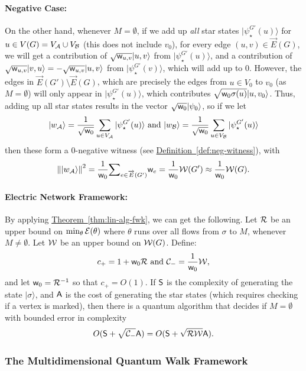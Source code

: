 \documentclass{article}
\newcommand{\thm}[1]{\hyperref[thm:#1]{Theorem~\ref*{thm:#1}}}
\newcommand{\defin}[1]{\hyperref[def:#1]{Definition~\ref*{def:#1}}}
\def\ket#1{{\lvert}#1\rangle}
\renewcommand{\>}{\rangle}
\newcommand{\<}{\langle}
\renewcommand{\(}{\left(}
\renewcommand{\)}{\right)}
\def\norm#1{\left\| #1 \right\|}
\def\w{{\sf w}}
\begin{document}
\paragraph{Negative Case:} On the other hand, whenever $M=\emptyset$, if we add up \emph{all} star states $\ket{\psi_\star^{G'}(u)}$ for $u\in V(G)=V_{\cal A}\cup V_{\cal B}$ (this does not include $v_0$), for every edge $(u,v)\in \overrightarrow{E}(G)$, we will get a contribution of $\sqrt{\w_{u,v}}\ket{u,v}$ from $\ket{\psi_\star^{G'}(u)}$, and a contribution of $\sqrt{\w_{u,v}}\ket{v,u}=-\sqrt{\w_{u,v}}\ket{u,v}$ from $\ket{\psi_\star^{G'}(v)}$, which will add up to 0. However, the edges in $\overrightarrow{E}(G')\setminus\overrightarrow{E}(G)$, which are precisely the edges from $u\in V_0$ to $v_0$ (as $M=\emptyset$) will only appear in $\ket{\psi_\star^{G'}(u)}$, which contributes $\sqrt{\w_0\sigma(u)}\ket{u,v_0}$. Thus, adding up all star states results in the vector $\sqrt{\w_0}\ket{\psi_0}$, so if we let 
$$\ket{w_{\cal A}}=\frac{1}{\sqrt{\w_0}}\sum_{u\in V_{\cal A}}\ket{\psi_\star^{G'}(u)}
\mbox{ and }
\ket{w_{\cal B}}=\frac{1}{\sqrt{\w_0}}\sum_{u\in V_{\cal B}}\ket{\psi_\star^{G'}(u)}
$$
then these form a 0-negative witness (see \defin{neg-witness}), with 
$$\norm{\ket{w_{\cal A}}}^2 = \frac{1}{\w_0}\textstyle{\displaystyle\sum}_{e\in \overrightarrow{E}(G')}\w_e = \displaystyle\frac{1}{\w_0}{\cal W}(G') \approx \frac{1}{\w_0}{\cal W}(G).$$

\paragraph{Electric Network Framework:} By applying \thm{lin-alg-fwk}, we can get the following. Let 
${\cal R}$ be an upper bound on $\min_\theta {\cal E}(\theta)$ where $\theta$ runs over all flows from $\sigma$ to $M$, whenever $M\neq \emptyset$. Let ${\cal W}$ be an upper bound on ${\cal W}(G)$. Define:
$$c_+ = 1+\w_0{\cal R}
\mbox{ and }
{\cal C}_- = \frac{1}{\w_0}{\cal W},$$
and let $\w_0={\cal R}^{-1}$ so that $c_+=O(1)$. 
If ${\sf S}$ is the complexity of generating the state $\ket{\sigma}$, and ${\sf A}$ is the cost of generating the star states (which requires checking if a vertex is marked), then there is a quantum algorithm that decides if $M=\emptyset$ with bounded error in complexity 
$$O({\sf S}+\sqrt{{\cal C}_-}{\sf A}) = O({\sf S}+\sqrt{{\cal R}{\cal W}}{\sf A}).$$

\subsubsection{The Multidimensional Quantum Walk Framework}\label{sec:alternative}
\end{document}
